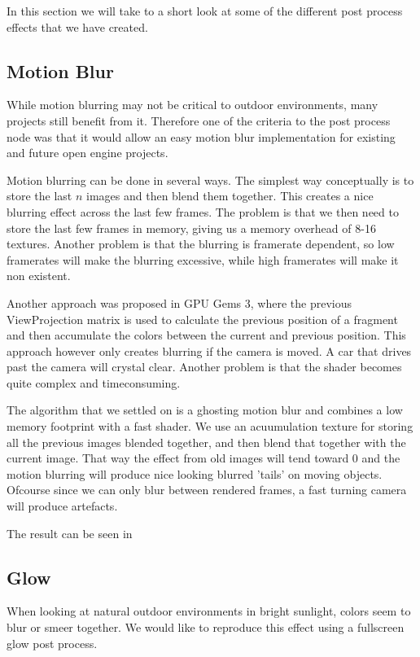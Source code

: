 In this section we will take to a short look at some of the different
post process effects that we have created.

\subsection{Motion Blur}

While motion blurring may not be critical to outdoor environments,
many projects still benefit from it. Therefore one of the criteria
to the post process node was that it would allow an easy motion blur
implementation for existing and future open engine projects.

Motion blurring can be done in several ways. The simplest way
conceptually is to store the last $n$ images and then blend them
together. This creates a nice blurring effect across the last few
frames. The problem is that we then need to store the last few frames
in memory, giving us a memory overhead of 8-16 textures. Another
problem is that the blurring is framerate dependent, so low framerates
will make the blurring excessive, while high framerates will make it
non existent.

Another approach was proposed in GPU Gems 3, where the previous
ViewProjection matrix is used to calculate the previous position of a
fragment and then accumulate the colors between the current and
previous position. This approach however only creates blurring if the
camera is moved. A car that drives past the camera will crystal
clear. Another problem is that the shader becomes quite complex and
timeconsuming.

The algorithm that we settled on is a ghosting motion blur and
combines a low memory footprint with a fast shader. We use an
acuumulation texture for storing all the previous images blended
together, and then blend that together with the current image. That
way the effect from old images will tend toward 0 and the motion
blurring will produce nice looking blurred 'tails' on moving
objects. Ofcourse since we can only blur between rendered frames, a
fast turning camera will produce artefacts.

The result can be seen in 

\subsection{Glow}

When looking at natural outdoor environments in bright sunlight,
colors seem to blur or smeer together. We would like to reproduce this
effect using a fullscreen glow post process. 

